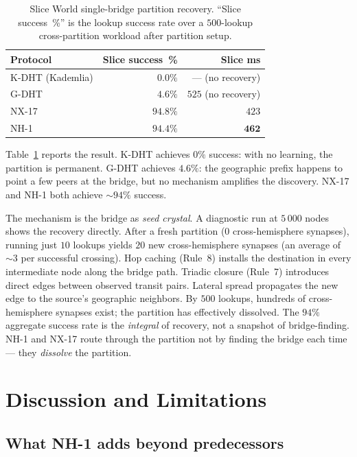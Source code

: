\documentclass[conference]{IEEEtran}
\newcommand{\nhone}{NH-1\xspace}
\newcommand{\GDHT}{G-DHT\xspace}
\newcommand{\NXseventeen}{NX-17\xspace}
\begin{document}
\begin{table}[t]
\centering
\caption{Slice World single-bridge partition recovery. ``Slice
success~\%'' is the lookup success rate over a $500$-lookup
cross-partition workload after partition setup.}
\label{tab:slice}
\small
\begin{tabular}{@{}lrr@{}}
\toprule
\textbf{Protocol} & \textbf{Slice success~\%} & \textbf{Slice ms} \\
\midrule
K-DHT (Kademlia) & $0.0\%$ & --- (no recovery) \\
\GDHT & $4.6\%$ & $525$ (no recovery) \\
\NXseventeen & $94.8\%$ & $423$ \\
\nhone & $\mathbf{94.4\%}$ & $\mathbf{462}$ \\
\bottomrule
\end{tabular}
\end{table}

Table~\ref{tab:slice} reports the result. K-DHT achieves $0\%$
success: with no learning, the partition is permanent. \GDHT achieves
$4.6\%$: the geographic prefix happens to point a few peers at the
bridge, but no mechanism amplifies the discovery. \NXseventeen and
\nhone both achieve $\sim\!94\%$ success.

The mechanism is the bridge as \emph{seed crystal}. A diagnostic run
at $5\,000$ nodes shows the recovery directly. After a fresh partition
($0$ cross-hemisphere synapses), running just $10$ lookups yields $20$
new cross-hemisphere synapses (an average of $\sim\!3$ per
successful crossing). Hop caching (Rule~8) installs the destination
in every intermediate node along the bridge path. Triadic closure
(Rule~7) introduces direct edges between observed transit pairs.
Lateral spread propagates the new edge to the source's geographic
neighbors. By $500$ lookups, hundreds of cross-hemisphere synapses
exist; the partition has effectively dissolved. The $94\%$ aggregate
success rate is the \emph{integral} of recovery, not a snapshot of
bridge-finding. \nhone and \NXseventeen route through the partition
not by finding the bridge each time --- they \emph{dissolve} the
partition.

\section{Discussion and Limitations}
\label{sec:discussion}

\subsection{What \nhone adds beyond predecessors}
\end{document}
